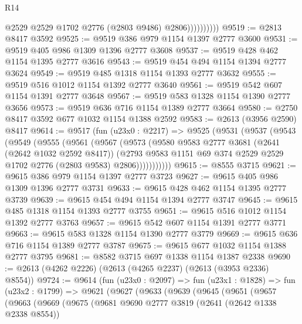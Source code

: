 \begin{lexlean}{R14}
\begin{coremodule}
                        @2529
                        @2529
                        @1702
                        @2776
                        (@2803 @9486)
                        @2806))))))))))
@9519 := @2813 @8417 @3592
@9525 := @9519 @386 @979 @1154 @1397 @2777 @3600
@9531 := @9519 @405 @986 @1309 @1396 @2777 @3608
@9537 := @9519 @428 @462 @1154 @1395 @2777 @3616
@9543 := @9519 @454 @494 @1154 @1394 @2777 @3624
@9549 := @9519 @485 @1318 @1154 @1393 @2777 @3632
@9555 := @9519 @516 @1012 @1154 @1392 @2777 @3640
@9561 := @9519 @542 @607 @1154 @1391 @2777 @3648
@9567 := @9519 @583 @1328 @1154 @1390 @2777 @3656
@9573 := @9519 @636 @716 @1154 @1389 @2777 @3664
@9580 := @2750 @8417 @3592 @677 @1032 @1154 @1388 @2592
@9583 := @2613 (@3956 @2590) @8417
@9614 := @9517
    (fun (u23x0 : @2217) =>
    @9525
      (@9531
        (@9537
          (@9543
            (@9549
              (@9555
                (@9561
                  (@9567
                    (@9573
                      (@9580
                        @9583
                        @2777
                        @3681
                        (@2641 (@2642 @1032 @2592 @8417))
                        (@2793
                          @9583
                          @1151
                          @69
                          @374
                          @2529
                          @2529
                          @1702
                          @2776
                          (@2803 @9583)
                          @2806)))))))))))
@9615 := @8555 @3715
@9621 := @9615 @386 @979 @1154 @1397 @2777 @3723
@9627 := @9615 @405 @986 @1309 @1396 @2777 @3731
@9633 := @9615 @428 @462 @1154 @1395 @2777 @3739
@9639 := @9615 @454 @494 @1154 @1394 @2777 @3747
@9645 := @9615 @485 @1318 @1154 @1393 @2777 @3755
@9651 := @9615 @516 @1012 @1154 @1392 @2777 @3763
@9657 := @9615 @542 @607 @1154 @1391 @2777 @3771
@9663 := @9615 @583 @1328 @1154 @1390 @2777 @3779
@9669 := @9615 @636 @716 @1154 @1389 @2777 @3787
@9675 := @9615 @677 @1032 @1154 @1388 @2777 @3795
@9681 := @8582 @3715 @697 @1338 @1154 @1387 @2338
@9690 := @2613 (@4262 @2226) (@2613 (@4265 @2237) (@2613 (@3953 @2336) @8554))
@9724 := @9614
    (fun (u23x0 : @2097) =>
    fun (u23x1 : @1828) =>
    fun (u23x2 : @1799) =>
    @9621
      (@9627
        (@9633
          (@9639
            (@9645
              (@9651
                (@9657
                  (@9663
                    (@9669
                      (@9675
                        (@9681
                          @9690
                          @2777
                          @3819
                          (@2641 (@2642 @1338 @2338 @8554))

\end{coremodule}
\end{lexlean}
